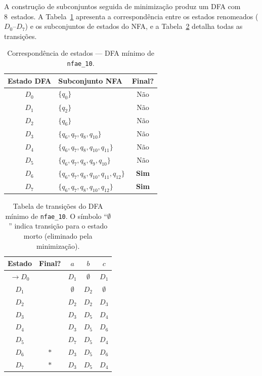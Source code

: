 \documentclass[sumario=abnt-6027-2012]{ifes8}
\begin{document}
A construção de subconjuntos seguida de minimização produz um DFA com
8~estados. A Tabela~\ref{tab:nfae10-estados} apresenta a correspondência
entre os estados renomeados ($D_0$--$D_7$) e os subconjuntos de estados do
NFA, e a Tabela~\ref{tab:nfae10-trans} detalha todas as transições.

\begin{table}[H]
  \centering
  \caption{Correspondência de estados — DFA mínimo de \texttt{nfae\_10}.}
  \label{tab:nfae10-estados}
  \begin{tabular}{clc}
    \toprule
    \textbf{Estado DFA} & \textbf{Subconjunto NFA} & \textbf{Final?} \\
    \midrule
    $D_0$ & $\{q_0\}$                                   & Não \\
    $D_1$ & $\{q_2\}$                                   & Não \\
    $D_2$ & $\{q_6\}$                                   & Não \\
    $D_3$ & $\{q_6,q_7,q_8,q_{10}\}$                   & Não \\
    $D_4$ & $\{q_6,q_7,q_8,q_{10},q_{11}\}$            & Não \\
    $D_5$ & $\{q_6,q_7,q_8,q_9,q_{10}\}$               & Não \\
    $D_6$ & $\{q_6,q_7,q_8,q_{10},q_{11},q_{12}\}$     & \textbf{Sim} \\
    $D_7$ & $\{q_6,q_7,q_8,q_{10},q_{12}\}$            & \textbf{Sim} \\
    \bottomrule
  \end{tabular}
\end{table}

\begin{table}[H]
  \centering
  \caption{Tabela de transições do DFA mínimo de \texttt{nfae\_10}. O
    símbolo ``$\emptyset$'' indica transição para o estado morto (eliminado
    pela minimização).}
  \label{tab:nfae10-trans}
  \renewcommand{\arraystretch}{1.2}
  \begin{tabular}{ccccc}
    \toprule
    \textbf{Estado} & \textbf{Final?} & $a$ & $b$ & $c$ \\
    \midrule
    $\to D_0$ &     & $D_1$       & $\emptyset$ & $D_1$ \\
    $D_1$     &     & $\emptyset$ & $D_2$       & $\emptyset$ \\
    $D_2$     &     & $D_2$       & $D_2$       & $D_3$ \\
    $D_3$     &     & $D_3$       & $D_5$       & $D_4$ \\
    $D_4$     &     & $D_3$       & $D_5$       & $D_6$ \\
    $D_5$     &     & $D_7$       & $D_5$       & $D_4$ \\
    $D_6$     & $*$ & $D_3$       & $D_5$       & $D_6$ \\
    $D_7$     & $*$ & $D_3$       & $D_5$       & $D_4$ \\
    \bottomrule
  \end{tabular}
\end{table}
\end{document}
